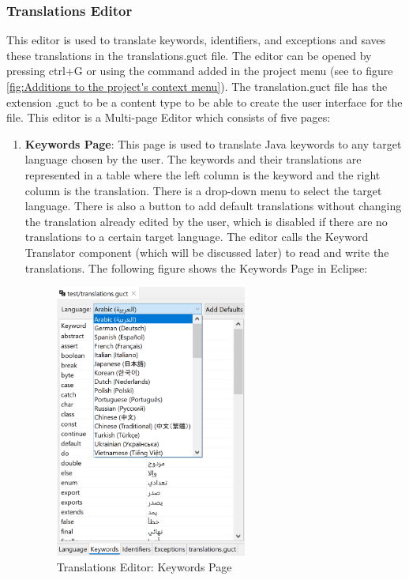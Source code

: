 \subsubsection{Translations Editor}
This editor is used to translate keywords, identifiers, and exceptions and saves these translations in the translations.guct file. The editor can be opened by pressing ctrl+G or using the command added in the project menu (see to figure \ref{fig:Additions to the project's context menu}). The translation.guct file has the extension .guct to be a content type to be able to create the user interface for the file. This editor is a Multi-page Editor which consists of five pages:

\begin{enumerate}
    \item \textbf{Keywords Page}: This page is used to translate Java keywords to any target language chosen by the user. The keywords and their translations are represented in a table where the left column is the keyword and the right column is the translation. There is a drop-down menu to select the target language. There is also a button to add default translations without changing the translation already edited by the user, which is disabled if there are no translations to a certain target language. The editor calls the Keyword Translator component (which will be discussed later) to read and write the translations. The following figure shows the Keywords Page in Eclipse:
   
    \begin{figure}[H]
    \centering
    \includegraphics[height=9cm]{ch3-images/keywordspage.png}
    \caption{Translations Editor: Keywords Page}
    \label{fig:Translations Editor: Keywords Page}
    \end{figure}
    

\end{enumerate}
